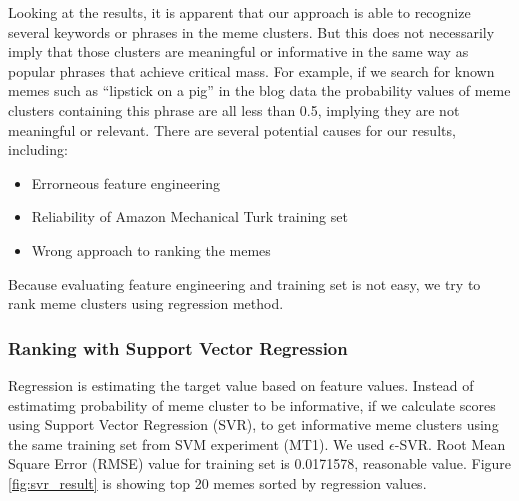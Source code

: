 \documentclass{sig-alternate}
\begin{document}
Looking at the results, it is apparent that our approach is able to recognize several keywords or phrases in the meme clusters.  But this does not necessarily imply that those clusters are meaningful or informative in the same way as popular phrases that achieve critical mass. For example, if  we search for known memes such as  ``lipstick on a pig'' in the blog data the probability values of meme clusters containing this phrase are all less than 0.5, implying they are not meaningful or relevant. There are several potential causes for our results, including:
\begin{itemize}
 \item Errorneous feature engineering
 \item Reliability of Amazon Mechanical Turk training set
 \item Wrong approach to ranking the memes
\end{itemize}

Because evaluating feature engineering and training set is not easy, we try to rank meme clusters using regression method.



\subsubsection{Ranking with Support Vector Regression}
Regression is estimating the target value based on feature values. Instead of estimatimg probability of meme cluster to be informative, if we calculate scores using Support Vector Regression (SVR), to get informative meme clusters using the same training set from SVM experiment (MT1). We used $\epsilon$-SVR. Root Mean Square Error (RMSE) value for training set is 0.0171578, reasonable value. Figure \ref{fig:svr_result} is showing top 20 memes sorted by regression values.
\end{document}
